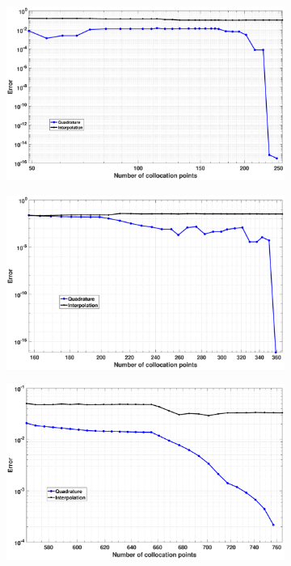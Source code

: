 \documentclass[11pt]{article}
\begin{document}
\begin{figure}
	\centering %
	\begin{subfigure}{0.6\textwidth}
		\includegraphics[width=\linewidth]{./case_N_2.eps}
		\caption{}
		\label{fig:1}
	\end{subfigure}\hfil %
	\begin{subfigure}{0.6\textwidth}
		\includegraphics[width=\linewidth]{./case_N_4.eps}
		\caption{}
		\label{fig:2}
	\end{subfigure}\hfil %
	\begin{subfigure}{0.6\textwidth}
		\includegraphics[width=\linewidth]{./case_N_8.eps}

\end{subfigure}
\end{figure}
\end{document}
